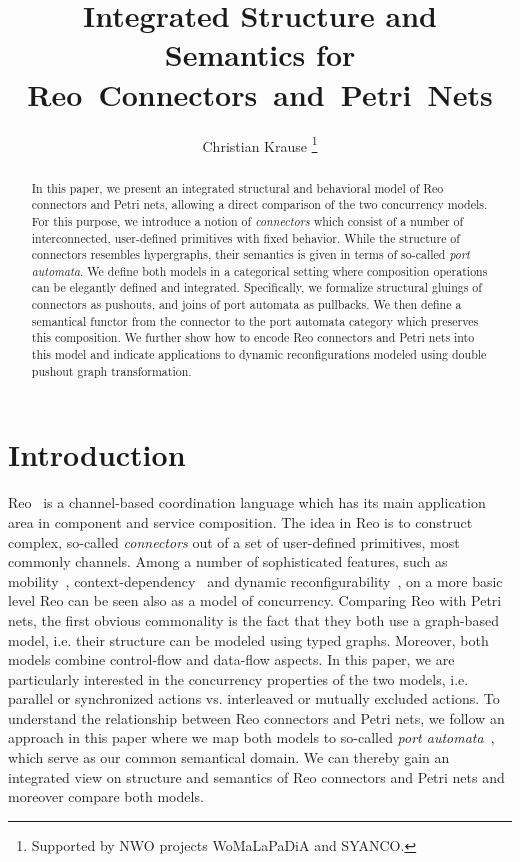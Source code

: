 \documentclass[copyright,creativecommons]{eptcs}
\title{Integrated Structure and Semantics for Reo~Connectors~and~Petri~Nets}
\author{Christian Krause
	\footnote{Supported by NWO projects WoMaLaPaDiA and SYANCO.}
	\email{c.krause@cwi.nl}
	\institute{
  		CWI, P.O. Box 94079, 1090GB Amsterdam, The Netherlands
	}
}
\begin{document}
\maketitle

\begin{abstract}
In this paper, we present an integrated structural and behavioral
model of Reo connectors and Petri nets, allowing a direct comparison 
of the two concurrency models. 
For this purpose, we introduce 
a notion of \emph{connectors}
which consist of a number of interconnected, 
user-defined primitives with fixed behavior.
While the structure of connectors resembles
hypergraphs, their semantics is given
in terms of so-called
\emph{port automata}. We define both
models in a categorical setting where composition
operations can be elegantly defined and
integrated. Specifically, we formalize structural gluings of
connectors as pushouts, and joins of port automata as
pullbacks. We then define a semantical functor from the connector to
the port automata category which
preserves this composition. We further show how to encode
Reo connectors and Petri nets into this model and indicate
applications to dynamic reconfigurations modeled using 
double pushout graph transformation.
\end{abstract}


\section{Introduction}

Reo~\cite{Arbab04} is a channel-based coordination language which
has its main application area in component and service composition.
The idea in Reo is to construct complex, so-called \emph{connectors}
out of a set of user-defined primitives, most commonly channels.
Among a number of sophisticated features, such as mobility~\cite{SABB06}, 
context-dependency~\cite{CCA07,BCS09}\nocite{Tiles}\nocite{Clarke07} and dynamic
reconfigurability~\cite{KMLA10}, on a more basic level Reo can be 
seen also as a model of concurrency. 
Comparing Reo with Petri nets, the first obvious commonality is the fact that
they both use a graph-based model, i.e. their structure can be modeled using 
typed graphs. Moreover, both models combine control-flow and data-flow
aspects. In this paper, we are particularly interested in
the concurrency properties of the two models, i.e.
parallel or synchronized actions vs. interleaved or mutually
excluded actions. To understand the relationship between
Reo connectors and Petri nets, we follow an approach in
this paper where we map both models to so-called \emph{port automata}~\cite{KC09},
which serve as our common semantical domain. We can thereby gain an integrated
view on structure and semantics of Reo connectors and Petri nets and moreover 
compare both models.
\end{document}

